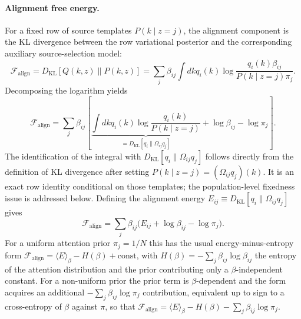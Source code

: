 \documentclass[11pt]{article}
\begin{document}
\paragraph{Alignment free energy.}
For a fixed row of source templates $P(k\mid z{=}j)$, the alignment component is the KL divergence between the row variational posterior and the corresponding auxiliary source-selection model:
\begin{equation}
\mathcal{F}_{\text{align}} = D_{\mathrm{KL}}[Q(k,z) \| P(k,z)] = \sum_j \beta_{ij} \int dk  q_i(k) \log \frac{q_i(k) \beta_{ij}}{P(k \mid z{=}j) \pi_j}.
\end{equation}
Decomposing the logarithm yields
\begin{equation}
\mathcal{F}_{\text{align}} = \sum_j \beta_{ij} \left[ \underbrace{\int dk  q_i(k) \log \frac{q_i(k)}{P(k \mid z{=}j)}}_{=  D_{\mathrm{KL}}[q_i \| \Omega_{ij} q_j]} + \log \beta_{ij} - \log \pi_j \right].
\label{eq:mixture_free_energy}
\end{equation}
The identification of the integral with $D_{\mathrm{KL}}[q_i \| \Omega_{ij} q_j]$ follows directly from the definition of KL divergence after setting $P(k \mid z{=}j) = (\Omega_{ij} q_j)(k)$. It is an exact row identity conditional on those templates; the population-level fixedness issue is addressed below. Defining the alignment energy $E_{ij} \equiv D_{\mathrm{KL}}[q_i \| \Omega_{ij} q_j]$ gives
\begin{equation}
\mathcal{F}_{\text{align}} = \sum_j \beta_{ij} \big( E_{ij} + \log \beta_{ij} - \log \pi_j \big).
\label{eq:mixture_energy_entropy}
\end{equation}
For a uniform attention prior $\pi_j = 1/N$ this has the usual energy-minus-entropy form $\mathcal{F}_{\text{align}} = \langle E \rangle_\beta - H(\beta) + \text{const}$, with $H(\beta) = -\sum_j \beta_{ij} \log \beta_{ij}$ the entropy of the attention distribution and the prior contributing only a $\beta$-independent constant. For a non-uniform prior the prior term is $\beta$-dependent and the form acquires an additional $-\sum_j \beta_{ij} \log \pi_j$ contribution, equivalent up to sign to a cross-entropy of $\beta$ against $\pi$, so that $\mathcal{F}_{\text{align}} = \langle E \rangle_\beta - H(\beta) - \sum_j \beta_{ij} \log \pi_j$.
\end{document}
